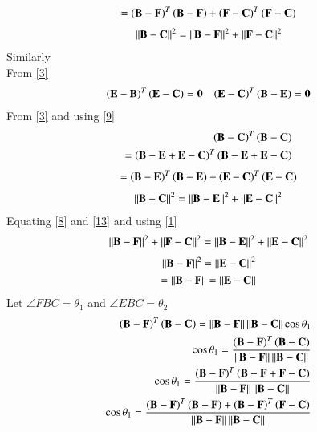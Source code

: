 \documentclass[journal,12pt,twocolumn]{IEEEtran}
\begin{document}
    \begin{align}
      =\left(\mathbf{B}-\mathbf{F}\right)^T\left(\mathbf{B}-\mathbf{F}\right)+\left(\mathbf{F}-\mathbf{C}\right)^T\left(\mathbf{F}-\mathbf{C}\right) 
    \end{align}
\begin{align}
   \left\lVert\mathbf{B}-\mathbf{C}\right\rVert^2=\left\lVert\mathbf{B}-\mathbf{F}\right\rVert^2+\left\lVert\mathbf{F}-\mathbf{C}\right\rVert^2\label{8} 
    \end{align}
    Similarly\\
    From \eqref{3}
    \begin{align}
        \left(\mathbf{E}-\mathbf{B}\right)^T\left(\mathbf{E}-\mathbf{C}\right)=\mathbf{0} && \left(\mathbf{E}-\mathbf{C}\right)^T\left(\mathbf{B}-\mathbf{E}\right)=\mathbf{0}\label{9}
        \end{align}
From  \eqref{3} and using \eqref{9}  
\begin{align}
    \left(\mathbf{B}-\mathbf{C}\right)^T\left(\mathbf{B}-\mathbf{C}\right)\\
    =\left(\mathbf{B}-\mathbf{E}+\mathbf{E}-\mathbf{C}\right)^T\left(\mathbf{B}-\mathbf{E}+\mathbf{E}-\mathbf{C}\right)
    \end{align}
    \begin{align}
      =\left(\mathbf{B}-\mathbf{E}\right)^T\left(\mathbf{B}-\mathbf{E}\right)+\left(\mathbf{E}-\mathbf{C}\right)^T\left(\mathbf{E}-\mathbf{C}\right) 
    \end{align}
\begin{align}
   \left\lVert\mathbf{B}-\mathbf{C}\right\rVert^2=\left\lVert\mathbf{B}-\mathbf{E}\right\rVert^2+\left\lVert\mathbf{E}-\mathbf{C}\right\rVert^2\label{13}
    \end{align}        
    Equating \eqref{8} and \eqref{13} and using \eqref{1}
    \begin{align}
      \left\lVert\mathbf{B}-\mathbf{F}\right\rVert^2+\left\lVert\mathbf{F}-\mathbf{C}\right\rVert^2 = \left\lVert\mathbf{B}-\mathbf{E}\right\rVert^2+\left\lVert\mathbf{E}-\mathbf{C}\right\rVert^2  
    \end{align}
    \begin{align}
       \left\lVert\mathbf{B}-\mathbf{F}\right\rVert^2=\left\lVert\mathbf{E}-\mathbf{C}\right\rVert^2\\
       =\left\lVert\mathbf{B}-\mathbf{F}\right\rVert=\left\lVert\mathbf{E}-\mathbf{C}\right\rVert\label{16}
    \end{align}
Let $\angle FBC=\theta_1$  and  $\angle EBC=\theta_2$
    \begin{align}
        \left(\mathbf{B}-\mathbf{F}\right)^T\left(\mathbf{B}-\mathbf{C}\right)=\left\lVert\mathbf{B}-\mathbf{F}\right\rVert\left\lVert\mathbf{B}-\mathbf{C}\right\rVert\cos\theta_1\\
        \cos{\theta_1}=\frac{\left(\mathbf{B}-\mathbf{F}\right)^T\left(\mathbf{B}-\mathbf{C}\right)}{\left\lVert\mathbf{B}-\mathbf{F}\right\rVert\left\lVert\mathbf{B}-\mathbf{C}\right\rVert}\\
        \cos{\theta_1}=\frac{\left(\mathbf{B}-\mathbf{F}\right)^T\left(\mathbf{B}-\mathbf{F}+\mathbf{F}-\mathbf{C}\right)}{\left\lVert\mathbf{B}-\mathbf{F}\right\rVert\left\lVert\mathbf{B}-\mathbf{C}\right\rVert}\\
        \cos{\theta_1}=\frac{\left(\mathbf{B}-\mathbf{F}\right)^T\left(\mathbf{B}-\mathbf{F}\right) +\left(\mathbf{B}-\mathbf{F}\right)^T\left(\mathbf{F}-\mathbf{C}\right)}{\left\lVert\mathbf{B}-\mathbf{F}\right\rVert\left\lVert\mathbf{B}-\mathbf{C}\right\rVert}
        \end{align}
\end{document}
